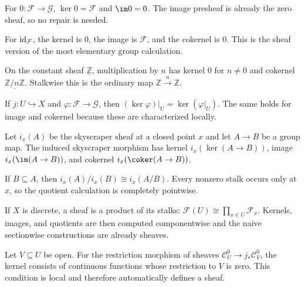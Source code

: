 \begin{example}
For $0:\mathcal F\to\mathcal G$, $\ker 0=\mathcal F$ and $\im 0=0$. The image presheaf is already the zero sheaf, so no repair is needed.
\end{example}

\begin{example}
For $\operatorname{id}_{\mathcal F}$, the kernel is $0$, the image is $\mathcal F$, and the cokernel is $0$. This is the sheaf version of the most elementary group calculation.
\end{example}

\begin{example}
On the constant sheaf $\underline{\mathbb Z}$, multiplication by $n$ has kernel $0$ for $n\neq0$ and cokernel $\underline{\mathbb Z/n\mathbb Z}$. Stalkwise this is the ordinary map $\mathbb Z\xrightarrow{n}\mathbb Z$.
\end{example}

\begin{example}
If $j:U\hookrightarrow X$ and $\varphi:\mathcal F\to\mathcal G$, then $(\ker\varphi)|_U=\ker(\varphi|_U)$. The same holds for image and cokernel because these are characterized locally.
\end{example}

\begin{example}
Let $i_x(A)$ be the skyscraper sheaf at a closed point $x$ and let $A\to B$ be a group map. The induced skyscraper morphism has kernel $i_x(\ker(A\to B))$, image $i_x(\im(A\to B))$, and cokernel $i_x(\coker(A\to B))$.
\end{example}

\begin{example}
If $B\subseteq A$, then $i_x(A)/i_x(B)\cong i_x(A/B)$. Every nonzero stalk occurs only at $x$, so the quotient calculation is completely pointwise.
\end{example}

\begin{example}
If $X$ is discrete, a sheaf is a product of its stalks: $\mathcal F(U)\cong\prod_{x\in U}\mathcal F_x$. Kernels, images, and quotients are then computed componentwise and the naive sectionwise constructions are already sheaves.
\end{example}

\begin{example}
Let $V\subseteq U$ be open. For the restriction morphism of sheaves $\mathcal C^0_U\to j_*\mathcal C^0_V$, the kernel consists of continuous functions whose restriction to $V$ is zero. This condition is local and therefore automatically defines a sheaf.
\end{example}

